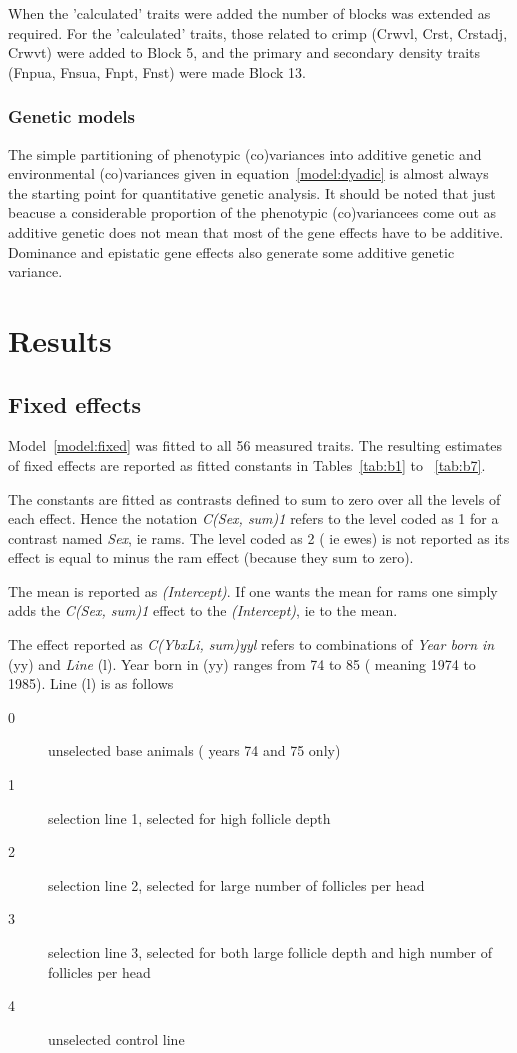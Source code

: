 \documentclass[titlepage]{article}  %
\begin{document}
When the 'calculated'  traits were added the number of blocks was extended as required. For the 'calculated' traits, those related to crimp (Crwvl, Crst, Crstadj, Crwvt) were added to Block 5, and the primary and secondary density traits (Fnpua, Fnsua, Fnpt, Fnst) were made Block 13.

\subsubsection{Genetic models}
The simple partitioning of phenotypic (co)variances into additive genetic and environmental (co)variances given in equation~\ref{model:dyadic} is almost always the starting point for quantitative genetic analysis. It should be noted that just beacuse a considerable proportion of the phenotypic (co)variancees come out as additive genetic does not mean that most of the gene effects have to be additive. Dominance and epistatic gene effects also generate some additive genetic variance. 


\section{Results}

\subsection{Fixed effects}
Model~\ref{model:fixed} was fitted to all 56 measured traits. The resulting estimates of fixed effects are reported as fitted constants in Tables~\ref{tab:b1} to ~\ref{tab:b7}.







 The constants are fitted as contrasts defined to sum to zero over all the levels of each effect. Hence the notation {\em C(Sex, sum)1} refers to the level coded as 1 for a contrast named {\em Sex}, ie rams. The level coded as 2 ( ie ewes) is not reported as its effect is equal to minus the ram effect (because they sum to zero).

The mean is reported as {\em (Intercept)}. If one wants the mean for rams one simply adds the {\em C(Sex, sum)1} effect to the {\em (Intercept)}, ie to the mean.

The effect reported as {\em C(YbxLi, sum)yyl} refers to combinations of {\em Year born in} (yy) and {\em Line} (l).  Year born in (yy) ranges from 74 to 85 ( meaning 1974 to 1985). Line (l) is as follows
\begin{description}
\item[0] unselected base animals ( years 74 and 75 only)
\item[1] selection line 1, selected for high follicle depth
\item[2] selection line 2, selected for large number of follicles per head
\item[3] selection line 3, selected for both large follicle depth and high number of follicles per head
\item[4] unselected control line
\end{description}
\end{document}
